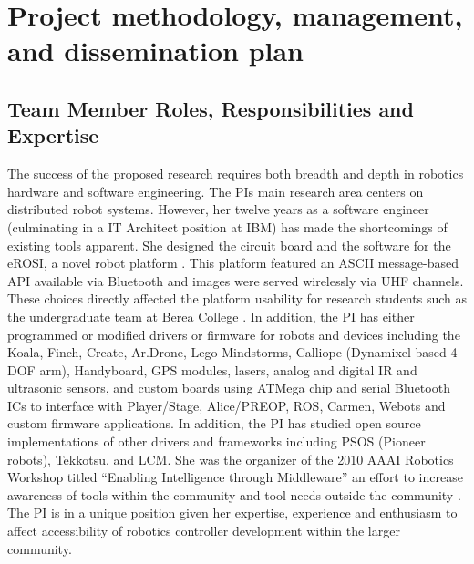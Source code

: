 
\section{Project methodology, management, and dissemination plan}
\subsection{Team Member Roles, Responsibilities and Expertise}


The success of the proposed research requires both breadth and depth in robotics hardware and software engineering.  The PIs main research area centers on distributed robot systems.  However, her twelve years as a software engineer (culminating in a IT Architect position at IBM) has made the shortcomings of existing tools apparent.  She designed the circuit board and the software for the eROSI, a novel robot platform \cite{walter2007design}.  This platform featured an ASCII message-based API available via Bluetooth and images were served wirelessly via UHF channels.  These choices directly affected the platform usability for research students such as the undergraduate team at Berea College \cite{Isaacs2006}.  In addition, the PI has either programmed or modified drivers or firmware for robots and devices including the Koala, Finch, Create, Ar.Drone, Lego Mindstorms, Calliope (Dynamixel-based 4 DOF arm), Handyboard, GPS modules, lasers, analog and digital IR and ultrasonic sensors, and custom boards using ATMega chip and serial Bluetooth ICs to interface with Player/Stage, Alice/PREOP, ROS, Carmen, Webots and custom firmware applications.  In addition, the PI has studied open source implementations of other drivers and frameworks including PSOS (Pioneer robots), Tekkotsu, and LCM.  She was the organizer of the 2010 AAAI Robotics Workshop titled ``Enabling Intelligence through Middleware'' an effort to increase awareness of tools within the community and tool needs outside the community \cite{MonicaAnderson2011}. The PI is in a unique position given her expertise, experience and enthusiasm to affect accessibility of robotics controller development within the larger community.


